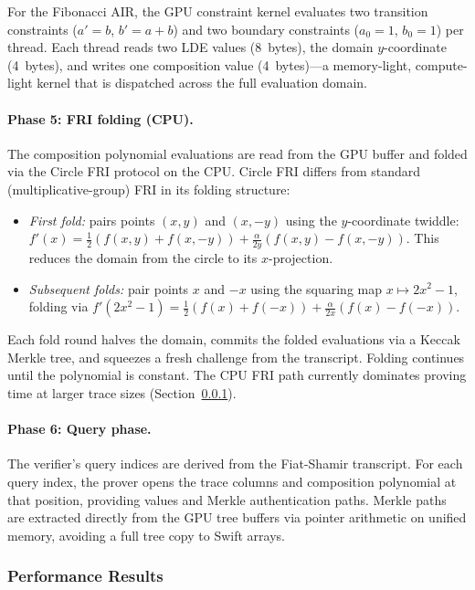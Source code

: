 For the Fibonacci AIR, the GPU constraint kernel evaluates two transition
constraints ($a' = b$, $b' = a + b$) and two boundary constraints
($a_0 = 1$, $b_0 = 1$) per thread.  Each thread reads two LDE values
(8~bytes), the domain $y$-coordinate (4~bytes), and writes one composition
value (4~bytes)---a memory-light, compute-light kernel that is dispatched
across the full evaluation domain.

\paragraph{Phase 5: FRI folding (CPU).}
The composition polynomial evaluations are read from the GPU buffer and
folded via the Circle FRI protocol on the CPU.  Circle FRI differs from
standard (multiplicative-group) FRI in its folding structure:

\begin{itemize}
\item \emph{First fold:} pairs points $(x, y)$ and $(x, -y)$ using the
  $y$-coordinate twiddle: $f'(x) = \tfrac{1}{2}(f(x,y) + f(x,-y)) +
  \tfrac{\alpha}{2y}(f(x,y) - f(x,-y))$.  This reduces the domain from
  the circle to its $x$-projection.
\item \emph{Subsequent folds:} pair points $x$ and $-x$ using the squaring
  map $x \mapsto 2x^2 - 1$, folding via $f'(2x^2-1) =
  \tfrac{1}{2}(f(x) + f(-x)) + \tfrac{\alpha}{2x}(f(x) - f(-x))$.
\end{itemize}

Each fold round halves the domain, commits the folded evaluations via a
Keccak Merkle tree, and squeezes a fresh challenge from the transcript.
Folding continues until the polynomial is constant.  The CPU FRI path
currently dominates proving time at larger trace sizes
(Section~\ref{sec:circle-perf}).

\paragraph{Phase 6: Query phase.}
The verifier's query indices are derived from the Fiat-Shamir transcript.
For each query index, the prover opens the trace columns and composition
polynomial at that position, providing values and Merkle authentication
paths.  Merkle paths are extracted directly from the GPU tree buffers via
pointer arithmetic on unified memory, avoiding a full tree copy to Swift
arrays.

\subsubsection{Performance Results}
\label{sec:circle-perf}

